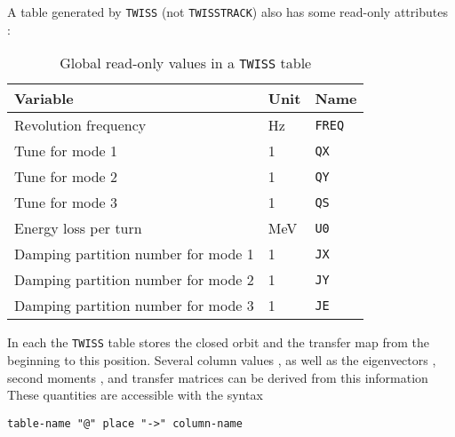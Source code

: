 A table generated by \texttt{TWISS} (not \texttt{TWISSTRACK})
also has some read-only attributes :
\begin{table}[Ht] \footnotesize
  \begin{center}
    \caption{Global read-only values in a \texttt{TWISS} table}
    \label{tab:twiss-glob}
    \begin{tabular}{|l|l|l|}
      \hline
      Variable & Unit & Name \\
      \hline
      Revolution frequency & Hz & \texttt{FREQ}\index{FREQ} \\
      Tune for mode 1 & 1 & \texttt{QX}\index{QX} \\
      Tune for mode 2 & 1 & \texttt{QY}\index{QY} \\
      Tune for mode 3 & 1 & \texttt{QS}\index{QS} \\
      Energy loss per turn & MeV & \texttt{U0}\index{U0} \\
      Damping partition number for mode 1 & 1 & \texttt{JX}\index{JX} \\
      Damping partition number for mode 2 & 1 & \texttt{JY}\index{JY} \\
      Damping partition number for mode 3 & 1 & \texttt{JE}\index{JE} \\
      \hline
    \end{tabular}
  \end{center}
\end{table}

In each the \texttt{TWISS} table stores the closed orbit and the
transfer map from the beginning to this position.
Several column values ,
as well as the eigenvectors ,
second moments ,
and transfer matrices  can be derived from this
information
These quantities are accessible with the syntax 
\begin{verbatim}
table-name "@" place "->" column-name
\end{verbatim}

